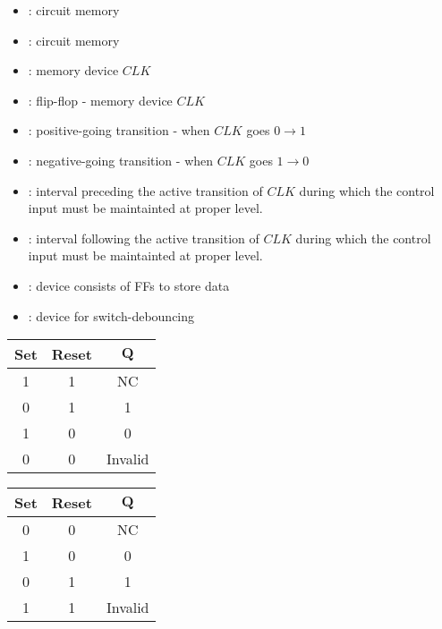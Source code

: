 \begin{multicols}{4}
  
    \begin{itemize}
      \item {}: circuit  memory
      \item {}: circuit  memory
      \item {}: memory device  $CLK$
      \item {}: flip-flop - memory device  $CLK$
      \item {}: positive-going transition - when $CLK$ goes $0 \to 1$
      \item {}: negative-going transition - when $CLK$ goes $1 \to 0$
      \item {}: interval preceding the active transition
        of $CLK$ during which the control input must be maintainted at proper
        level.
      \item {}: interval following the active transition
        of $CLK$ during which the control input must be maintainted at proper
        level.
      \item {}: device consists of FFs to store data
      \item {}: device for switch-debouncing

    \end{itemize}

      \begin{tabular}{|c|c|c|}
      \hline
      \textbf{Set} & \textbf{Reset} & $\pmb{Q}$ \\
      \hline
      1            & 1              & NC         \\
      \hline
      0            & 1              & 1          \\
      \hline
      1            & 0              & 0          \\
      \hline
      0            & 0              & Invalid    \\
      \hline         
      \end{tabular}

      \begin{tabular}{|c|c|c|}
      \hline
      \textbf{Set} & \textbf{Reset} & $\pmb{Q}$ \\
      \hline
      0            & 0              & NC         \\
      \hline
      1            & 0              & 0          \\
      \hline
      0            & 1              & 1          \\
      \hline
      1            & 1              & Invalid    \\
      \hline         
      \end{tabular}


\end{multicols}
